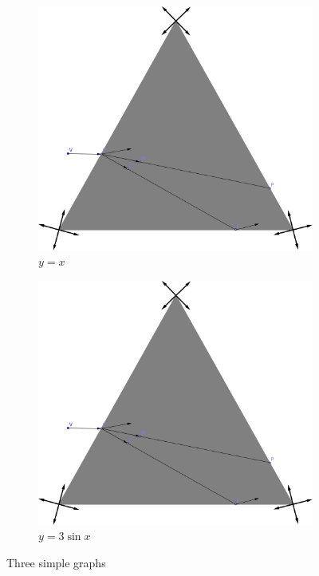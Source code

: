 \begin{figure}[!h]
     \centering
     \begin{subfigure}[b]{0.49\textwidth}
         \centering
         \includegraphics[width=\textwidth]{images/stream_1.png}
         \caption{$y=x$}
         \label{fig:y equals x}
     \end{subfigure}
     \hfill
     \begin{subfigure}[b]{0.49\textwidth}
         \centering
         \includegraphics[width=\textwidth]{images/stream_1.png}
         \caption{$y=3\sin x$}
         \label{fig:three sin x}
     \end{subfigure}
        \caption{Three simple graphs}
        \label{fig:draw_streams}
\end{figure}


